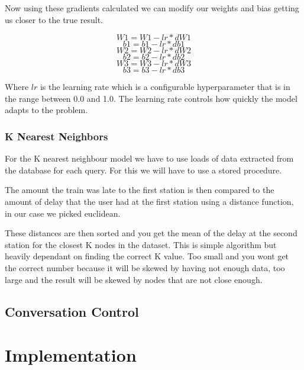 \documentclass[11pt]{article}
\begin{document}
	Now using these gradients calculated we can modify our weights and bias getting us closer to the true result.
	
	\[W1 = W1 - lr * dW1\]
	\[b1 = b1 - lr * db1\]
	\[W2 = W2 - lr * dW2\]
	\[b2 = b2 - lr * db2\]
	\[W3 = W3 - lr * dW3\]
	\[b3 = b3 - lr * db3\]
	
	Where $lr$ is the learning rate which is a configurable hyperparameter that is in the range between 0.0 and 1.0. The learning rate controls how quickly the model adapts to the problem.
	
	\subsubsection{K Nearest Neighbors}		
	
	For the K nearest neighbour model we have to use loads of data extracted from the database for each query. For this we will have to use a stored procedure.
	
	The amount the train was late to the first station is then compared to the amount of delay that the user had at the first station using a distance function, in our case we picked euclidean.
	
	These distances are then sorted and you get the mean of the delay at the second station for the closest K nodes in the dataset. This is simple algorithm but heavily dependant on finding the correct K value. Too small and you wont get the correct number because it will be skewed by having not enough data, too large and the result will be skewed by nodes that are not close enough.
	
	\subsection{Conversation Control}
	
	
	\section{Implementation} \label{Implementation}
	
\end{document}
